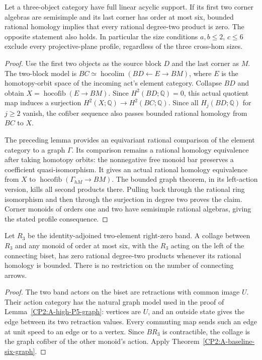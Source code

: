 \begin{corollary}
\label{CP2:A-baseline-semisimple-pair-six}
Let a three-object category have full linear acyclic
support.  If its first two corner algebras are semisimple
and its last corner has order at most six, bounded
rational homology implies that every rational degree-two
product is zero.  The opposite statement also holds.
In particular the size conditions $a,b\leq2$, $c\leq6$
exclude every projective-plane profile, regardless of
the three cross-hom sizes.
\end{corollary}
\begin{proof}
Use the first two objects as the source block $D$ and
the last corner as $M$.  The two-block model is
$BC\simeq\operatorname{hocolim}(BD\leftarrow E\to BM)$,
where $E$ is the homotopy-orbit space of the incoming
act's element category.  Collapse $BD$ and obtain
$X=\operatorname{hocofib}(E\to BM)$.
Since $H^2(BD;\mathbb Q)=0$, this actual quotient map
induces a surjection $H^2(X;\mathbb Q)\to H^2(BC;\mathbb Q)$.
Since all $H_j(BD;\mathbb Q)$ for $j\geq2$ vanish,
the cofiber sequence also passes bounded rational
homology from $BC$ to $X$.

The preceding lemma provides an equivariant rational
comparison of the element category to a graph $\Gamma$.
Its comparison remains a rational homology equivalence
after taking homotopy orbits: the nonnegative free
monoid bar preserves a coefficient quasi-isomorphism.
It gives an actual rational homology equivalence from
$X$ to $\operatorname{hocofib}(\Gamma_{hM}\to BM)$.
The bounded graph theorem, in its left-action version,
kills all second products there.  Pulling back through
the rational ring isomorphism and then through the
surjection in degree two proves the claim.  Corner
monoids of orders one and two have semisimple rational
algebras, giving the stated profile consequence.
\end{proof}

\begin{corollary}
\label{CP2:A-baseline-right-zero-three-six}
Let $R_3$ be the identity-adjoined two-element right-zero
band.  A collage between $R_3$ and any monoid of order
at most six, with the $R_3$ acting on the left of the
connecting biset, has zero rational degree-two products
whenever its rational homology is bounded.  There is
no restriction on the number of connecting arrows.
\end{corollary}
\begin{proof}
The two band actors on the biset are retractions with
common image $U$.  Their action category has the
natural graph model used in the proof of
Lemma~\ref{CP2:A-high-P5-graph}: vertices are $U$,
and an outside state gives the edge between its two
retraction values.  Every commuting map sends such
an edge at unit speed to an edge or to a vertex.
Since $BR_3$ is contractible, the collage is the
graph cofiber of the other monoid's action.  Apply
Theorem~\ref{CP2:A-baseline-six-graph}.
\end{proof}
